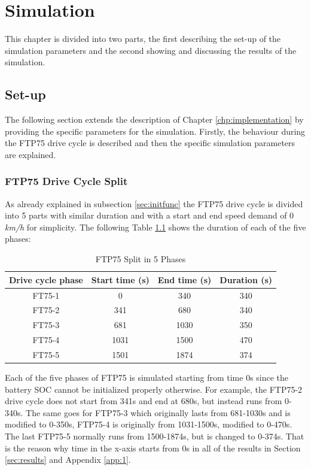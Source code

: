 \chapter{Simulation}
\label{chp:simulation}
This chapter is divided into two parts, the first describing the set-up of the simulation parameters and the second showing and discussing the results of the simulation.

\section{Set-up}
The following section extends the description of Chapter \ref{chp:implementation} by providing the specific parameters for the simulation. Firstly, the behaviour during the FTP75 drive cycle is described and then the specific simulation parameters are explained.

\subsection{FTP75 Drive Cycle Split}
As already explained in subsection \ref{sec:initfunc} the FTP75 drive cycle is divided into 5 parts with similar duration and with a start and end speed demand of 0 \textit{km/h} for simplicity. The following Table \ref{tab:drivecyclephases} shows the duration of each of the five phases:

\begin{table}
\centering
\begin{tabular}{ |c|c|c|c| } 
 \hline
 Drive cycle phase & Start time (s) & End time (s) & Duration (s) \\
 \hline\hline
 FT75-1 & 0 & 340 & 340\\ 
 FT75-2 & 341 & 680 & 340\\ 
 FT75-3 & 681 & 1030 & 350\\ 
 FT75-4 & 1031 & 1500 & 470\\ 
 FT75-5 & 1501 & 1874 & 374\\ 
 \hline
\end{tabular}
\caption{FTP75 Split in 5 Phases}
\label{tab:drivecyclephases}
\end{table}

Each of the five phases of FTP75 is simulated starting from time 0s since the battery SOC cannot be initialized properly otherwise. For example, the FTP75-2 drive cycle does not start from 341s and end at 680s, but instead runs from 0-340s. The same goes for FTP75-3 which originally lasts from 681-1030s and is modified to 0-350s, FTP75-4 is originally from 1031-1500s, modified to 0-470s. The last FTP75-5 normally runs from 1500-1874s, but is changed to 0-374s. That is the reason why time in the x-axis starts from 0s in all of the results in Section \ref{sec:results} and Appendix \ref{app:1}.

